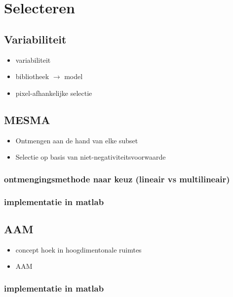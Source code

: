 \documentclass[12pt]{report}
\begin{document}
\chapter{Selecteren} \label{sec:select}

\section{Variabiliteit}

\begin{itemize}
\item variabiliteit
\item bibliotheek $\rightarrow$ model
\item pixel-afhankelijke selectie
\end{itemize}

\section{MESMA}

\begin{itemize}
\item Ontmengen aan de hand van elke subset
\item Selectie op basis van niet-negativiteitsvoorwaarde
\end{itemize}

\subsection{ontmengingsmethode naar keuz (lineair vs multilineair)}

\subsection{implementatie in matlab}

\section{AAM}

\begin{itemize}
\item concept hoek in hoogdimentonale ruimtes
\item AAM
\end{itemize}

\subsection{implementatie in matlab}
\end{document}
